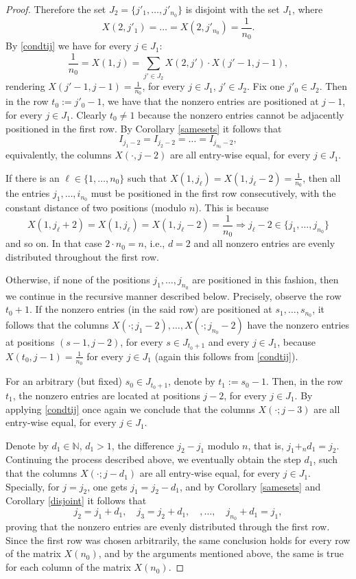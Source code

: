 \documentclass{article}
\theoremstyle{definition}\newtheorem{example}{Example}[section]
\def\NN{\mathbb{N}}
\begin{document}
\begin{proof}
		Therefore the set $J_2=\{j'_1,\ldots,j'_{n_0}\}$ is disjoint with the set $J_1$, where
		$$X(2,j'_1)=\ldots=X(2,j'_{n_0})=\frac{1}{n_0}.$$
		By \eqref{condtij} we have for every $j\in J_1$:
		$$\frac{1}{n_0}=X(1,j)=\sum_{j'\in J_2} X(2,j')\cdot X(j'-1,j-1),$$
		rendering $X(j'-1, j-1)=\frac{1}{n_0}$, for every $j\in J_1$, $j'\in J_2$.  Fix one $j'_0\in J_2$. Then in the row $t_0:=j'_0-1$, we have that the nonzero entries are positioned at $j-1$, for every $j\in J_1$. Clearly $t_0\neq 1$ because the nonzero entries cannot be adjacently positioned in the first row. By Corollary \ref{samesets} it follows that 
		$$I_{j_1-2}=I_{j_2-2}=\ldots=I_{j_{n_0}-2},$$
		equivalently, the columns $X(\cdot, j-2)$ are all entry-wise equal, for every $j\in J_1$. 
		
		If there is an $\ell\in\{1,\ldots,n_0\}$ such that $X(1,j_\ell)=X(1,j_\ell-2)=\frac{1}{n_0}$, then all the entries $j_1,\ldots,i_{n_0}$ must be positioned in the first row consecutively, with the constant distance of two positions (modulo $n$). This is because
		$$X(1,j_\ell+2)=X(1,j_\ell)=X(1,j_\ell-2)=\frac{1}{n_0}\Rightarrow j_\ell-2\in\{j_1,\ldots,j_{n_0}\}$$
		and so on. In that case $2\cdot n_0=n$, i.e., $d=2$ and all nonzero entries are evenly distributed throughout the first row. 
		
		Otherwise, if none of the positions $j_1,\ldots, j_{n_0}$ are positioned in this fashion, then we continue in the recursive manner described below. Precisely, observe the row $t_0+1$. If the nonzero entries (in the said row) are positioned at $s_1,\ldots,s_{n_0}$, it follows that the columns $X(\cdot; j_1-2),\ldots,X(\cdot; j_{n_0}-2)$ have the nonzero entries at positions $(s-1, j-2)$, for every $s\in J_{t_0+1}$ and every $j\in J_1$, because $X(t_0,j-1)=\frac{1}{n_0}$ for every $j\in J_1$ (again this follows from \eqref{condtij}). 
		
		
		
		For an arbitrary (but fixed) $s_0\in J_{t_0+1}$, denote by $t_1:=s_0-1$. Then, in the row $t_1$, the nonzero entries are located at  positions $j-2$, for every $j\in J_1$. By applying \eqref{condtij} once again we conclude that the columns $X(\cdot; j-3)$ are all entry-wise equal, for every $j\in J_1$.
		
		Denote by $d_1\in\NN$, $d_1>1$, the difference $j_2-j_1$ modulo $n$, that is, $j_1+_nd_1=j_2$. Continuing the process described above, we eventually obtain the step $d_1$, such that the columns $X(\cdot; j-d_1)$ are all entry-wise equal, for every $j\in J_1$. Specially, for $j=j_2$, one gets $j_1=j_2-d_1$, and by Corollary \ref{samesets} and Corollary \ref{disjoint} it follows that
		$$j_2=j_1+d_1,\quad j_3=j_2+d_1,\quad,\ldots,\quad j_{n_0}+d_1=j_1,$$
		proving that the nonzero entries are evenly distributed through the first row. Since the first row was chosen arbitrarily, the same conclusion holds for every row of the matrix $X(n_0)$, and by the arguments mentioned above, the same is true for each column of the matrix $X(n_0)$. 
	\end{proof}
	
\end{document}
